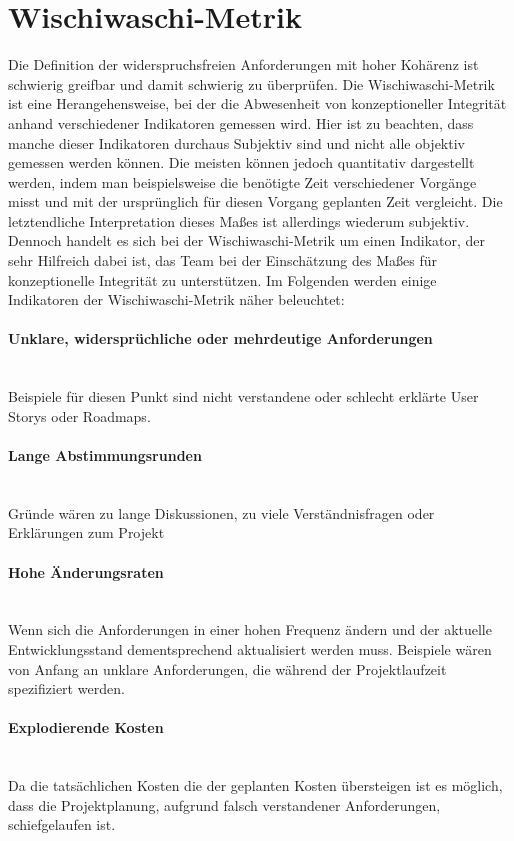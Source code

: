 \documentclass[a4paper, ngerman, 12pt, usenames, dvipsnames]{article}
\begin{document}
\section{Wischiwaschi-Metrik}
Die Definition der widerspruchsfreien Anforderungen mit hoher Kohärenz ist schwierig greifbar und damit schwierig zu überprüfen. Die Wischiwaschi-Metrik ist eine Herangehensweise, bei der die Abwesenheit von konzeptioneller Integrität anhand verschiedener Indikatoren gemessen wird. Hier ist zu beachten, dass manche dieser Indikatoren durchaus Subjektiv sind und nicht alle objektiv gemessen werden können. Die meisten können jedoch quantitativ dargestellt werden, indem man beispielsweise die benötigte Zeit verschiedener Vorgänge misst und mit der ursprünglich für diesen Vorgang geplanten Zeit vergleicht. Die letztendliche Interpretation dieses Maßes ist allerdings wiederum subjektiv. Dennoch handelt es sich bei der Wischiwaschi-Metrik um einen Indikator, der sehr Hilfreich dabei ist, das Team bei der Einschätzung des Maßes für konzeptionelle Integrität zu unterstützen. 
Im Folgenden werden einige Indikatoren der Wischiwaschi-Metrik näher beleuchtet:
\paragraph{Unklare, widersprüchliche oder mehrdeutige Anforderungen}\mbox{} \\
Beispiele für diesen Punkt sind nicht verstandene oder schlecht erklärte User Storys oder Roadmaps.
\paragraph{Lange Abstimmungsrunden}\mbox{} \\
Gründe wären zu lange Diskussionen, zu viele Verständnisfragen oder Erklärungen zum Projekt
\paragraph{Hohe Änderungsraten}\mbox{} \\
Wenn sich die Anforderungen in einer hohen Frequenz ändern und der aktuelle Entwicklungsstand dementsprechend aktualisiert werden muss. Beispiele wären von Anfang an unklare Anforderungen, die während der Projektlaufzeit spezifiziert werden.
\paragraph{Explodierende Kosten}\mbox{} \\
Da die tatsächlichen Kosten die der geplanten Kosten übersteigen ist es möglich, dass die Projektplanung, aufgrund falsch verstandener Anforderungen, schiefgelaufen ist.
\end{document}
